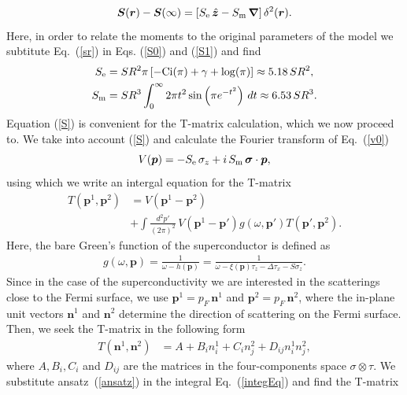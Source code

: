 \documentclass[twocolumn,showpacs,floatfix,nofootinbib,longbibliography]{revtex4-1}
\begin{document}
\begin{equation}
	\bm S(\bm r) - \bm S(\infty) = \left[ S_{\rm e}\, \hat{\bm z} - S_{\rm m}\, \bm \nabla\right] \delta^2(\bm r).
	\label{S}
\end{equation}
Here, in order to relate the moments to the original parameters of the model we subtitute Eq.~(\ref{sr}) in Eqs. (\ref{S0}) and (\ref{S1}) and find 
\begin{align}
	S_{\rm e} &= SR^2 \pi  \left [-\text{Ci}(\pi )+\gamma +\log (\pi )\right] \approx 5.18\, SR^2, \\
	S_{\rm m} &= SR^3 \int_0^{\infty } 2 \pi  t^2 \sin \left(\pi  e^{-t^2}\right) \, dt \approx 6.53\, SR^3.
\end{align}
Equation  (\ref{S}) is convenient for the T-matrix calculation, which we now proceed to. We take into account (\ref{S}) and calculate the Fourier transform of Eq.~(\ref{v0})  
\begin{equation}
	V(\bm p) = -S_{\rm e}\,\sigma_z +  i \,S_{\rm m} \, \bm \sigma\cdot \bm  p,
	\label{vp}
\end{equation}
using which we write an intergal equation for the T-matrix
\begin{align}
	T\left(\bm p^{1},\bm p^{2}\right) &= V \left(\bm p^{1}-\bm p^{2}\right) \nonumber \\
	& +\int \frac{d^2 p'}{\left( 2\pi \right)^2}\, V\left(\bm p^{1}-\bm p'\right) g(\omega,\bm p')  T\left(\bm p',\bm p^{2}\right).
	\label{integEq}
\end{align}
Here, the bare Green's function of the superconductor is defined as 
\begin{align}
	g(\omega,\bm p) = \frac{1}{\omega-h(\bm p)} = \frac{1}{\omega-\xi(\bm p)\tau_z-\Delta \tau_x - S\sigma_z}. \label{g}
\end{align}
Since in the case of the superconductivity we are interested in the scatterings close to the Fermi surface, we use $\bm p^{1} = p_F\, \bm n^{1}$ and $\bm p^{2} = p_F \,\bm n^{2}$, where the in-plane unit vectors $\bm n^{1}$ and $\bm n^{2}$ determine the direction of scattering on the Fermi surface.  Then, we seek the T-matrix in the following form
\begin{align}
	T\left(\bm n^{1},\bm n^{2}\right) &= A + B_i n^{1}_i + C_i n^{2}_j + D_{ij} n^{1}_i n^{2}_j, \label{ansatz}
\end{align}
where  $A,B_i,C_i$ and $D_{ij}$ are the matrices in the four-components space $\sigma\otimes\tau$. We substitute ansatz~(\ref{ansatz}) in the integral Eq.~(\ref{integEq}) and find the T-matrix
\end{document}

